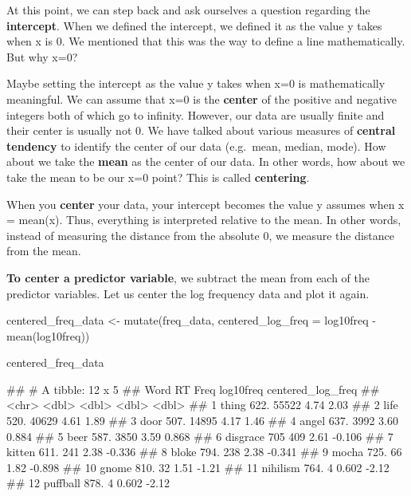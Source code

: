 \documentclass[
]{book}
\newenvironment{Shaded}{\begin{snugshade}}{\end{snugshade}}
\newcommand{\AttributeTok}[1]{\textcolor[rgb]{0.77,0.63,0.00}{#1}}
\newcommand{\FunctionTok}[1]{\textcolor[rgb]{0.00,0.00,0.00}{#1}}
\newcommand{\NormalTok}[1]{#1}
\newcommand{\OtherTok}[1]{\textcolor[rgb]{0.56,0.35,0.01}{#1}}
\newcommand{\SpecialCharTok}[1]{\textcolor[rgb]{0.00,0.00,0.00}{#1}}
\begin{document}
At this point, we can step back and ask ourselves a question regarding the \textbf{intercept}. When we defined the intercept, we defined it as the value y takes when x is 0. We mentioned that this was the way to define a line mathematically. But why x=0?

Maybe setting the intercept as the value y takes when x=0 is mathematically meaningful. We can assume that x=0 is the \textbf{center} of the positive and negative integers both of which go to infinity. However, our data are usually finite and their center is usually not 0. We have talked about various measures of \textbf{central tendency} to identify the center of our data (e.g.~mean, median, mode). How about we take the \textbf{mean} as the center of our data. In other words, how about we take the mean to be our x=0 point? This is called \textbf{centering}.

When you \textbf{center} your data, your intercept becomes the value y assumes when x = mean(x). Thus, everything is interpreted relative to the mean. In other words, instead of measuring the distance from the absolute 0, we measure the distance from the mean.

\textbf{To center a predictor variable}, we subtract the mean from each of the predictor variables. Let us center the log frequency data and plot it again.

\begin{Shaded}
\begin{Highlighting}[]
\NormalTok{centered\_freq\_data }\OtherTok{\textless{}{-}} \FunctionTok{mutate}\NormalTok{(freq\_data, }\AttributeTok{centered\_log\_freq =}\NormalTok{ log10freq }\SpecialCharTok{{-}} \FunctionTok{mean}\NormalTok{(log10freq))}

\NormalTok{centered\_freq\_data}
\end{Highlighting}
\end{Shaded}

\begin{Shaded}
\begin{Highlighting}[]
\NormalTok{\#\# \# A tibble: 12 x 5}
\NormalTok{\#\#    Word        RT  Freq log10freq centered\_log\_freq}
\NormalTok{\#\#    \textless{}chr\textgreater{}    \textless{}dbl\textgreater{} \textless{}dbl\textgreater{}     \textless{}dbl\textgreater{}             \textless{}dbl\textgreater{}}
\NormalTok{\#\#  1 thing     622. 55522     4.74              2.03 }
\NormalTok{\#\#  2 life      520. 40629     4.61              1.89 }
\NormalTok{\#\#  3 door      507. 14895     4.17              1.46 }
\NormalTok{\#\#  4 angel     637.  3992     3.60              0.884}
\NormalTok{\#\#  5 beer      587.  3850     3.59              0.868}
\NormalTok{\#\#  6 disgrace  705    409     2.61             {-}0.106}
\NormalTok{\#\#  7 kitten    611.   241     2.38             {-}0.336}
\NormalTok{\#\#  8 bloke     794.   238     2.38             {-}0.341}
\NormalTok{\#\#  9 mocha     725.    66     1.82             {-}0.898}
\NormalTok{\#\# 10 gnome     810.    32     1.51             {-}1.21 }
\NormalTok{\#\# 11 nihilism  764.     4     0.602            {-}2.12 }
\NormalTok{\#\# 12 puffball  878.     4     0.602            {-}2.12}
\end{Highlighting}
\end{Shaded}
\end{document}
